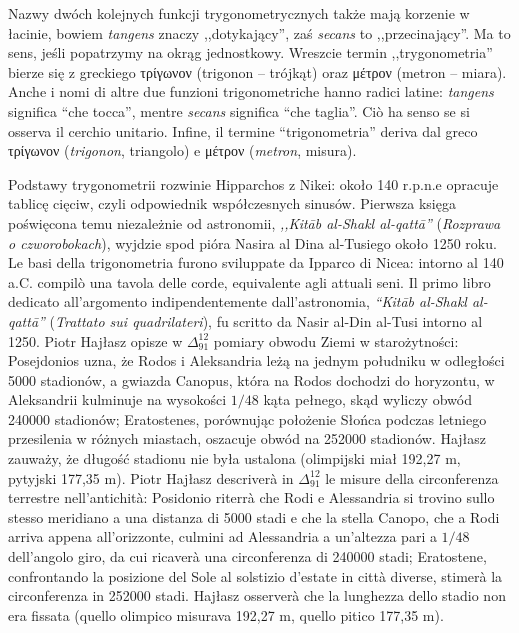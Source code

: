 Nazwy dwóch kolejnych funkcji trygonometrycznych także mają korzenie w łacinie, bowiem \emph{tangens} znaczy ,,dotykający'', zaś \emph{secans} to ,,przecinający''. %
Ma to sens, jeśli popatrzymy na okrąg jednostkowy. %
Wreszcie termin ,,trygonometria'' bierze się z greckiego τρίγωνον (trigonon -- trójkąt) oraz μέτρον (metron -- miara). %
Anche i nomi di altre due funzioni trigonometriche hanno radici latine: \emph{tangens} significa ``che tocca'', mentre \emph{secans} significa ``che taglia''. %
Ciò ha senso se si osserva il cerchio unitario. %
Infine, il termine ``trigonometria'' deriva dal greco τρίγωνον (\emph{trigonon}, triangolo) e μέτρον (\emph{metron}, misura). %

Podstawy trygonometrii rozwinie Hipparchos z Nikei: około 140 r.p.n.e opracuje tablicę cięciw, czyli odpowiednik współczesnych sinusów. %
Pierwsza księga poświęcona temu niezależnie od astronomii, \emph{,,Kitāb al-Shakl al-qattā''} (\emph{Rozprawa o czworobokach}), wyjdzie spod pióra Nasira al Dina al-Tusiego około 1250 roku. %
Le basi della trigonometria furono sviluppate da Ipparco di Nicea: intorno al 140 a.C. compilò una tavola delle corde, equivalente agli attuali seni. %
Il primo libro dedicato all'argomento indipendentemente dall'astronomia, \emph{``Kitāb al-Shakl al-qattā''} (\emph{Trattato sui quadrilateri}), fu scritto da Nasir al-Din al-Tusi intorno al 1250. %
Piotr Hajłasz opisze w $\Delta_{91}^{12}$ pomiary obwodu Ziemi w starożytności: Posejdonios uzna, że Rodos i Aleksandria leżą na jednym południku w odległości 5000 stadionów, a gwiazda Canopus, która na Rodos dochodzi do horyzontu, w Aleksandrii kulminuje na wysokości $1/48$ kąta pełnego, skąd wyliczy obwód 240000 stadionów; Eratostenes, porównując położenie Słońca podczas letniego przesilenia w różnych miastach, oszacuje obwód na 252000 stadionów. Hajłasz zauważy, że długość stadionu nie była ustalona (olimpijski miał 192,27 m, pytyjski 177,35 m). %
Piotr Hajłasz descriverà in $\Delta_{91}^{12}$ le misure della circonferenza terrestre nell'antichità: Posidonio riterrà che Rodi e Alessandria si trovino sullo stesso meridiano a una distanza di 5000 stadi e che la stella Canopo, che a Rodi arriva appena all'orizzonte, culmini ad Alessandria a un'altezza pari a $1/48$ dell'angolo giro, da cui ricaverà una circonferenza di 240000 stadi; Eratostene, confrontando la posizione del Sole al solstizio d'estate in città diverse, stimerà la circonferenza in 252000 stadi. Hajłasz osserverà che la lunghezza dello stadio non era fissata (quello olimpico misurava 192,27 m, quello pitico 177,35 m). %
%

%